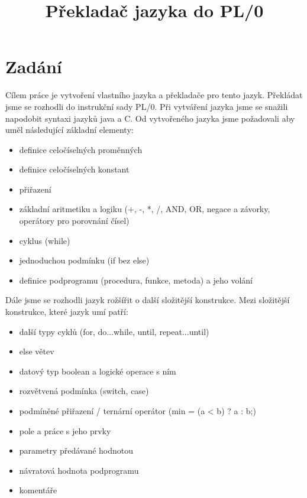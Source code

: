\documentclass[czech]{thesiskiv}
\title{Překladač jazyka do PL/0}
\begin{document}
%
\maketitle
\thispagestyle{empty} 
\pagestyle{empty}
\tableofcontents
{}

\chapter{Zadání}
\pagestyle{plain}
\setcounter{page}{1}
Cílem práce je vytvoření vlastního jazyka a překladače pro tento jazyk.
Překládat jsme se rozhodli do instrukční sady PL/0.
Při vytváření jazyka jsme se snažili napodobit syntaxi jazyků java a C.
Od vytvořeného jazyka jsme požadovali aby uměl následující základní elementy:

\begin{itemize}
\item definice celočíselných proměnných
\item definice celočíselných konstant
\item přiřazení
\item základní aritmetiku a logiku (+, -, *, /, AND, OR, negace a závorky, operátory pro porovnání čísel)
\item cyklus (while)
\item jednoduchou podmínku (if bez else)
\item definice podprogramu (procedura, funkce, metoda) a jeho volání
\end{itemize}

\noindent Dále jsme se rozhodli jazyk rožšířit o další složitější konstrukce.
Mezi složitější konstrukce, které jazyk umí patří:

\begin{itemize}
\item další typy cyklů (for, do...while, until, repeat...until)
\item else větev
\item datový typ boolean a logické operace s ním
\item rozvětvená podmínka (switch, case)
\item podmíněné přiřazení / ternární operátor (min = (a < b) ? a : b;)
\item pole a práce s jeho prvky
\item parametry předávané hodnotou
\item návratová hodnota podprogramu
\item komentáře
\end{itemize}
\end{document}
